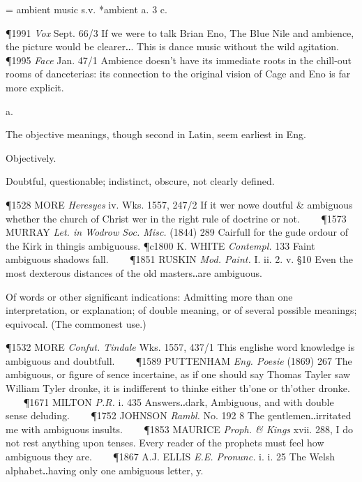 \begin{description}[wide, labelwidth=!, labelindent=0pt]
\begin{myenumerate}
 = ambient music s.v. *ambient a. 3 c. 

\P 1991 \textit{Vox} Sept. 66/3 If we were to talk Brian Eno, The Blue Nile and ambience, the picture would be clearer‥. This is dance music without the wild agitation.    
\P 1995 \textit{Face} Jan. 47/1 Ambience doesn't have its immediate roots in the chill-out rooms of danceterias: its connection to the original vision of Cage and Eno is far more explicit.
\end{myenumerate}


  a.

\noindent  {}


\noindent  
The objective meanings, though second in Latin, seem earliest in Eng. 
\vspace{-0.3cm}

\begin{myenumerate}
 Objectively. 

 Doubtful, questionable; indistinct, obscure, not clearly defined. 

\P 1528 MORE \textit{Heresyes} iv. Wks. 1557, 247/2 If it wer nowe doutful \& ambiguous whether the church of Christ wer in the right rule of doctrine or not.    
\P 1573 MURRAY \textit{Let. in Wodrow Soc. Misc.} (1844) 289 Cairfull for the gude ordour of the Kirk in thingis ambiguouss.
\P c1800 K. WHITE \textit{Contempl.} 133 Faint ambiguous shadows fall.    
\P 1851 RUSKIN \textit{Mod. Paint.} I. ii. 2. v. §10 Even the most dexterous distances of the old masters‥are ambiguous.

 Of words or other significant indications: Admitting more than one interpretation, or explanation; of double meaning, or of several possible meanings; equivocal. (The commonest use.) 

\P 1532 MORE \textit{Confut. Tindale} Wks. 1557, 437/1 This englishe word knowledge is ambiguous and doubtfull.    
\P 1589 PUTTENHAM \textit{Eng. Poesie} (1869) 267 The ambiguous, or figure of sence incertaine, as if one should say Thomas Tayler saw William Tyler dronke, it is indifferent to thinke either th'one or th'other dronke.    
\P 1671 MILTON \textit{P.R.} i. 435 Answers‥dark, Ambiguous, and with double sense deluding.    
\P 1752 JOHNSON \textit{Rambl.} No. 192 8 The gentlemen‥irritated me with ambiguous insults.    
\P 1853 MAURICE \textit{Proph. \& Kings} xvii. 288, I do not rest anything upon tenses. Every reader of the prophets must feel how ambiguous they are.    
\P 1867 A.J. ELLIS \textit{E.E. Pronunc.} i. i. 25 The Welsh alphabet‥having only one ambiguous letter, y.


\end{myenumerate}
\end{description}
